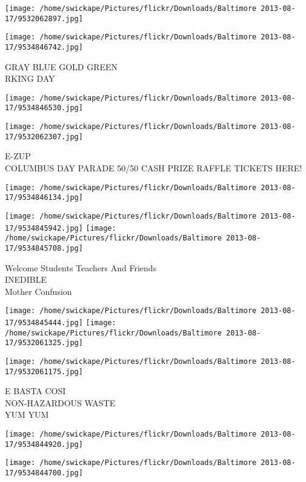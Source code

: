 \documentclass[10pt,letterpaper]{article}
\begin{document}
\texttt{[image: /home/swickape/Pictures/flickr/Downloads/Baltimore 2013-08-17/9532062897.jpg]}

\vspace{0.25in}
\texttt{[image: /home/swickape/Pictures/flickr/Downloads/Baltimore 2013-08-17/9534846742.jpg]}

GRAY BLUE GOLD GREEN\\
RKING DAY
\pagebreak

\texttt{[image: /home/swickape/Pictures/flickr/Downloads/Baltimore 2013-08-17/9534846530.jpg]}

\vspace{0.25in}
\texttt{[image: /home/swickape/Pictures/flickr/Downloads/Baltimore 2013-08-17/9532062307.jpg]}

E{-}ZUP\\
COLUMBUS DAY PARADE 50/50 CASH PRIZE RAFFLE TICKETS HERE!
\pagebreak

\texttt{[image: /home/swickape/Pictures/flickr/Downloads/Baltimore 2013-08-17/9534846134.jpg]}

\vspace{0.25in}
\texttt{[image: /home/swickape/Pictures/flickr/Downloads/Baltimore 2013-08-17/9534845942.jpg]}
\texttt{[image: /home/swickape/Pictures/flickr/Downloads/Baltimore 2013-08-17/9534845708.jpg]}

Welcome Students Teachers And Friends\\
INEDIBLE\\
Mother Confusion
\pagebreak

\texttt{[image: /home/swickape/Pictures/flickr/Downloads/Baltimore 2013-08-17/9534845444.jpg]}
\texttt{[image: /home/swickape/Pictures/flickr/Downloads/Baltimore 2013-08-17/9532061325.jpg]}

\vspace{0.25in}
\texttt{[image: /home/swickape/Pictures/flickr/Downloads/Baltimore 2013-08-17/9532061175.jpg]}

E BASTA COSI\\
NON{-}HAZARDOUS WASTE\\
YUM YUM
\pagebreak

\texttt{[image: /home/swickape/Pictures/flickr/Downloads/Baltimore 2013-08-17/9534844920.jpg]}

\vspace{0.25in}
\texttt{[image: /home/swickape/Pictures/flickr/Downloads/Baltimore 2013-08-17/9534844700.jpg]}
\end{document}
